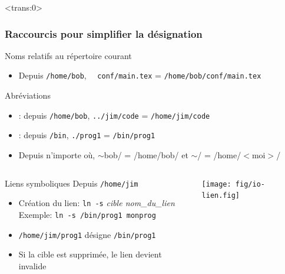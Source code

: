 \begin{frame}<trans:0>\frametitle{Raccourcis pour simplifier la
    désignation}

  \begin{block}{Noms relatifs au répertoire courant}
    \begin{itemize}
    \item Depuis \texttt{/home/bob},~~ \texttt{conf/main.tex} =
      \texttt{/home/bob/conf/main.tex}
    \end{itemize}
  \end{block}

  \begin{block}{Abréviations}
    \begin{itemize}
    \item {}: depuis \texttt{/home/bob},
      \texttt{\texttt{\alert{..}}/jim/code} = \texttt{/home/jim/code}
    \item {}: depuis \texttt{/bin},
      \texttt{\texttt{\alert{.}}/prog1} = \texttt{/bin/prog1}
    \item Depuis n'importe où, \texttt{\alert{$\sim$}}bob/ = /home/bob/ et \alert{$\sim$}/ = /home/$<$moi$>$/
    \end{itemize} 
  \end{block}

  \begin{columns}
    \begin{column}{.68\textwidth}
      \begin{block}{Liens symboliques}
        Depuis \texttt{/home/jim}
        \begin{itemize}
        \item Création du lien: \texttt{ln -s} \textit{cible nom\_du\_lien}\\
          Exemple: \texttt{ln -s /bin/prog1 monprog}
        \item \texttt{/home/jim/prog1} désigne \texttt{/bin/prog1}
        \item Si la cible est supprimée, le lien devient invalide
        \end{itemize}
      \end{block}
    \end{column}    
    \begin{column}{.3\textwidth}
      \texttt{[image: fig/io-lien.fig]}
    \end{column}
  \end{columns}
\end{frame}

